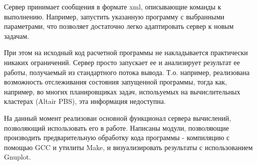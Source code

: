 Сервер принимает сообщения в формате xml, описывающие команды к выполнению. Например, запустить указанную программу с выбранными параметрами, что позволяет достаточно легко адаптировать сервер к новым задачам.

При этом на исходный код расчетной программы не накладывается практически никаких ограничений. Сервер просто запускает ее и анализирует результат ее работы, получаемый из стандартного потока вывода. Т.о. например, реализована возможность отслеживания состояния запущенной программы, тогда как, например, во многих планировщиках задач, испольуемых на вычислительных кластерах (Altair PBS), эта информация недоступна.

На данный момент реализован основной функционал сервера вычислений, позволяющий использовать его в работе. Написаны модули, позволяющие производить предварительную обработку кода программы - компиляцию с помощью GCC и утилиты Make, и визуализировать результаты с использованием Gnuplot.